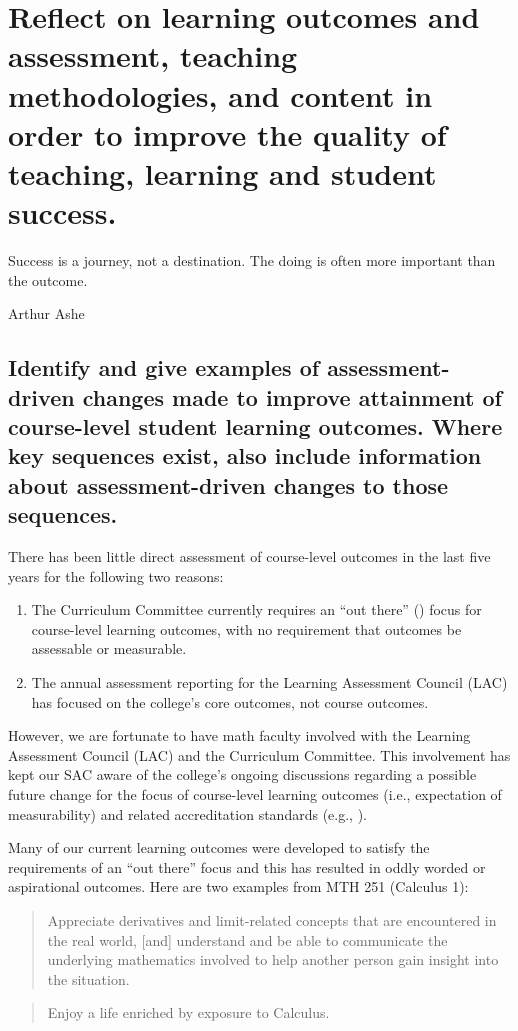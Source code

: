 \chapter[Outcomes and Assessment]{Reflect on learning outcomes and assessment,
teaching methodologies, and content in order to improve the quality of teaching,
learning and student success.}\label{chap:outcomes}
\epigraph{Success is a journey, not a destination. The doing is often more important than the outcome.}{Arthur Ashe}

\section[Course-Level Outcomes]{Identify and give examples of assessment-driven
changes made to improve attainment of course-level student learning outcomes.
Where key sequences exist, also include information about assessment-driven
changes to those sequences.}

There has been little direct assessment of course-level outcomes in the last
five years for the following two reasons: 
\begin{enumerate}
\item The Curriculum Committee currently requires an ``out there''
  (\cite{courseoutcomes}) focus for course-level learning outcomes, with no
  requirement that outcomes be assessable or measurable.  
\item The annual assessment reporting for the Learning Assessment Council (LAC)
  has focused on the college's core outcomes, not course outcomes.  
\end{enumerate}


However, we are fortunate to have math faculty involved with the Learning
Assessment Council (LAC) and the Curriculum Committee. This involvement has kept
our SAC aware of the college's ongoing discussions regarding a possible future
change for the focus of course-level learning outcomes  (i.e., expectation of
measurability) and related accreditation standards (e.g., \cite[Standard
4.A.3]{NWCCU}).

Many of our current learning outcomes were developed to satisfy the requirements
of an ``out there'' focus and this has resulted in oddly worded or aspirational
outcomes.  Here are two examples from MTH 251 (Calculus 1):

\begin{quote}
Appreciate derivatives and limit-related concepts that are encountered in the
real world, [and] understand and be able to communicate the underlying
mathematics involved to help another person gain insight into the situation.
\end{quote}
\begin{quote}
Enjoy a life enriched by exposure to Calculus.
\end{quote}


